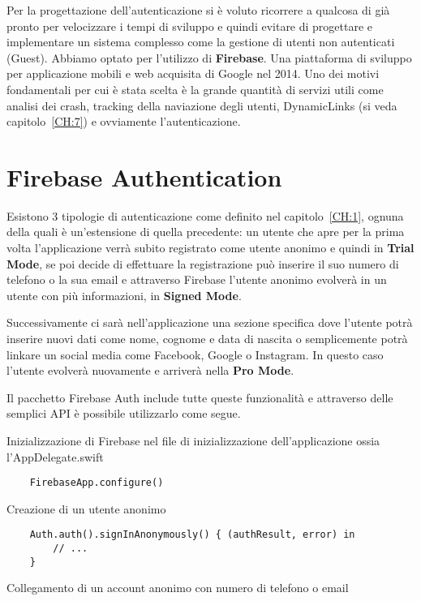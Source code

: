 
Per la progettazione dell'autenticazione si è voluto ricorrere a qualcosa di 
già pronto per velocizzare i tempi di sviluppo e quindi evitare di progettare e implementare un sistema 
complesso come la gestione di utenti non autenticati (Guest).
Abbiamo optato per l'utilizzo di \textbf{Firebase}\cite{firebase}.
Una piattaforma di sviluppo per applicazione mobili e web acquisita di Google nel 2014. 
Uno dei motivi fondamentali per cui è stata scelta è la grande quantità di servizi utili come
analisi dei crash, tracking della naviazione degli utenti, DynamicLinks (si veda capitolo~\ref{CH:7})
e ovviamente l'autenticazione.

\section{Firebase Authentication}

Esistono 3 tipologie di autenticazione come definito nel capitolo~\ref{CH:1}, ognuna della quali è un'estensione
di quella precedente: un utente che apre per la prima volta l'applicazione verrà subito registrato 
come utente anonimo e quindi in \textbf{Trial Mode}, se poi decide di effettuare la registrazione può inserire 
il suo numero di telefono o la sua email e attraverso Firebase l'utente anonimo evolverà in un utente con più
informazioni, in \textbf{Signed Mode}.

Successivamente ci sarà nell'applicazione una sezione specifica dove l'utente potrà inserire nuovi dati come nome, cognome e data di nascita
o semplicemente potrà linkare un social media come Facebook, Google o Instagram. In questo caso l'utente evolverà nuovamente 
e arriverà nella \textbf{Pro Mode}.

Il pacchetto Firebase Auth include tutte queste funzionalità e attraverso delle semplici API
è possibile utilizzarlo come segue.

Inizializzazione di Firebase nel file di inizializzazione dell'applicazione ossia l'AppDelegate.swift

\begin{verbatim}
    FirebaseApp.configure()
\end{verbatim}

Creazione di un utente anonimo

\begin{verbatim}
    Auth.auth().signInAnonymously() { (authResult, error) in
        // ...
    }
\end{verbatim}

Collegamento di un account anonimo con numero di telefono o email

